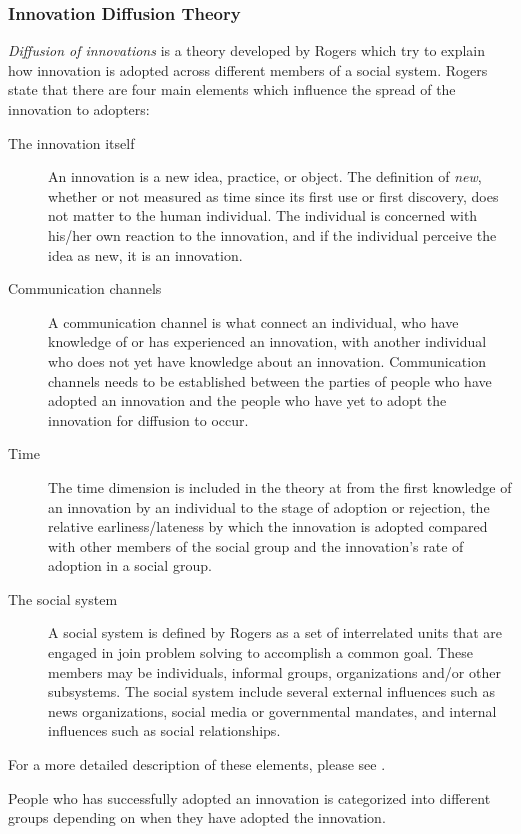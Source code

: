 \subsubsection{Innovation Diffusion Theory}
\textit{Diffusion of innovations} is a theory developed by Rogers \cite{Rogers1983} which try to explain how innovation is adopted across different members of a social system. Rogers state that there are four main elements which influence the spread of the innovation to adopters:

\begin{description}
  \item [The innovation itself] An innovation is a new idea, practice, or object. The definition of \textit{new}, whether or not measured as time since its first use or first discovery, does not matter to the human individual. The individual is concerned with his/her own reaction to the innovation, and if the individual perceive the idea as new, it is an innovation.
  \item [Communication channels] A communication channel is what connect an individual, who have knowledge of or has experienced an innovation, with another individual who does not yet have knowledge about an innovation. Communication channels needs to be established between the parties of people who have adopted an innovation and the people who have yet to adopt the innovation for diffusion to occur.
  \item [Time] The time dimension is included in the theory at from the first knowledge of an innovation by an individual to the stage of adoption or rejection, the relative earliness/lateness by which the innovation is adopted compared with other members of the social group and the innovation's rate of adoption in a social group.
  \item [The social system] A social system is defined by Rogers \cite{Rogers1983} as a set of interrelated units that are engaged in join problem solving to accomplish a common goal. These members may be individuals, informal groups, organizations and/or other subsystems. The social system include several external influences such as news organizations, social media or governmental mandates, and internal influences such as social relationships.
\end{description}

For a more detailed description of these elements, please see \cite{Rogers1983}.

People who has successfully adopted an innovation is categorized into different groups depending on when they have adopted the innovation.

